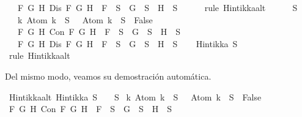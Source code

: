 \begin{isabellebody}
\ \ {\isasymand}\ {\isacharparenleft}{\isasymforall}F\ G\ H{\isachardot}\ Dis\ F\ G\ H\ {\isasymlongrightarrow}\ F\ {\isasymin}\ S\ {\isasymlongrightarrow}\ G\ {\isasymin}\ S\ {\isasymor}\ H\ {\isasymin}\ S{\isacharparenright}{\isacharparenright}{\isachardoublequoteclose}\isanewline
\ \ \ \ \isamarkupfalse%
\ {\isacharparenleft}rule\ Hintikka{\isacharunderscore}alt{}{\isacharparenright}\isanewline
{}\isamarkupfalse%
\isanewline
\ \ \isamarkupfalse%
\ {\isachardoublequoteopen}{\isacharparenleft}{\isasymbottom}\ {\isasymnotin}\ S\isanewline
\ \ {\isasymand}\ {\isacharparenleft}{\isasymforall}k{\isachardot}\ Atom\ k\ {\isasymin}\ S\ {\isasymlongrightarrow}\ \isactrlbold {\isasymnot}\ {\isacharparenleft}Atom\ k{\isacharparenright}\ {\isasymin}\ S\ {\isasymlongrightarrow}\ False{\isacharparenright}\isanewline
\ \ {\isasymand}\ {\isacharparenleft}{\isasymforall}F\ G\ H{\isachardot}\ Con\ F\ G\ H\ {\isasymlongrightarrow}\ F\ {\isasymin}\ S\ {\isasymlongrightarrow}\ G\ {\isasymin}\ S\ {\isasymand}\ H\ {\isasymin}\ S{\isacharparenright}\isanewline
\ \ {\isasymand}\ {\isacharparenleft}{\isasymforall}F\ G\ H{\isachardot}\ Dis\ F\ G\ H\ {\isasymlongrightarrow}\ F\ {\isasymin}\ S\ {\isasymlongrightarrow}\ G\ {\isasymin}\ S\ {\isasymor}\ H\ {\isasymin}\ S{\isacharparenright}{\isacharparenright}{\isachardoublequoteclose}\isanewline
\ \ \isamarkupfalse%
\ {\isachardoublequoteopen}Hintikka\ S{\isachardoublequoteclose}\isanewline
\ \ \ \ \isamarkupfalse%
\ {\isacharparenleft}rule\ Hintikka{\isacharunderscore}alt{}{\isacharparenright}\isanewline
{}\isamarkupfalse%
%
\endisatagproof
{\isafoldproof}%
%
\isadelimproof
%
\endisadelimproof
%
\begin{isamarkuptext}%
Del mismo modo, veamos su demostración automática.%
\end{isamarkuptext}\isamarkuptrue%
\isamarkupfalse%
\ Hintikka{\isacharunderscore}alt{\isacharcolon}\ {\isachardoublequoteopen}Hintikka\ S\ {\isacharequal}\ {\isacharparenleft}{\isasymbottom}\ {\isasymnotin}\ S\isanewline
{\isasymand}\ {\isacharparenleft}{\isasymforall}k{\isachardot}\ Atom\ k\ {\isasymin}\ S\ {\isasymlongrightarrow}\ \isactrlbold {\isasymnot}\ {\isacharparenleft}Atom\ k{\isacharparenright}\ {\isasymin}\ S\ {\isasymlongrightarrow}\ False{\isacharparenright}\isanewline
{\isasymand}\ {\isacharparenleft}{\isasymforall}F\ G\ H{\isachardot}\ Con\ F\ G\ H\ {\isasymlongrightarrow}\ F\ {\isasymin}\ S\ {\isasymlongrightarrow}\ G\ {\isasymin}\ S\ {\isasymand}\ H\ {\isasymin}\ S{\isacharparenright}\isanewline

\end{isabellebody}
